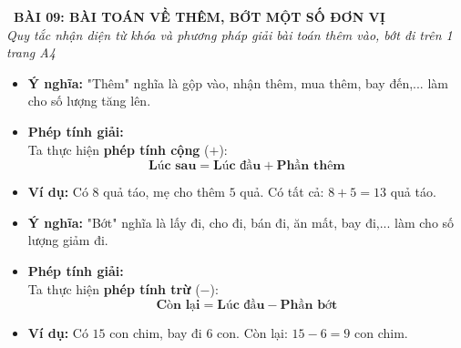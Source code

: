 \documentclass[11pt,a4paper]{article}
\begin{document}
\begin{tcolorbox}[
  enhanced,
  colback=violet!8!white,
  colframe=violet!70!black,
  arc=3mm, boxrule=1.2pt,
  left=3mm, right=3mm, top=2mm, bottom=2mm,
  halign=center
]
  {\LARGE\bfseries\color{violet!90!black}\faBookmark\ BÀI 09: BÀI TOÁN VỀ THÊM, BỚT MỘT SỐ ĐƠN VỊ}\\[1mm]
  {\itshape\footnotesize\color{black!75} Quy tắc nhận diện từ khóa và phương pháp giải bài toán thêm vào, bớt đi trên 1 trang A4}
\end{tcolorbox}

\vspace{-2mm}

\noindent
\begin{minipage}[t]{0.49\textwidth}\vspace{0pt}
\begin{tcolorbox}[
  enhanced,
  colback=violet!4!white,
  colframe=violet!75!black,
  arc=2mm, boxrule=0.8pt,
  left=2mm, right=2mm, top=1.8mm, bottom=1.8mm,
  title={\footnotesize\bfseries\color{white}\faKey\ 1. Bài toán về "thêm"}
]
{\footnotesize
\begin{itemize}\setlength{\itemsep}{1pt}\setlength{\leftskip}{-2.5mm}
  \item \textbf{Ý nghĩa:} "Thêm" nghĩa là gộp vào, nhận thêm, mua thêm, bay đến,... làm cho số lượng tăng lên.
  \item \textbf{Phép tính giải:}\\
  Ta thực hiện \textbf{phép tính cộng} ($+$):
  $$\mathbf{\text{Lúc sau} = \text{Lúc đầu} + \text{Phần thêm}}$$
  \item \textbf{Ví dụ:} Có $8$ quả táo, mẹ cho thêm $5$ quả. Có tất cả: $8 + 5 = 13$ quả táo.
\end{itemize}
}
\end{tcolorbox}
\end{minipage}
\hfill
\begin{minipage}[t]{0.49\textwidth}\vspace{0pt}
\begin{tcolorbox}[
  enhanced,
  colback=teal!4!white,
  colframe=teal!75!black,
  arc=2mm, boxrule=0.8pt,
  left=2mm, right=2mm, top=1.8mm, bottom=1.8mm,
  title={\footnotesize\bfseries\color{white}\faSliders\ 2. Bài toán về "bớt"}
]
{\footnotesize
\begin{itemize}\setlength{\itemsep}{1pt}\setlength{\leftskip}{-2.5mm}
  \item \textbf{Ý nghĩa:} "Bớt" nghĩa là lấy đi, cho đi, bán đi, ăn mất, bay đi,... làm cho số lượng giảm đi.
  \item \textbf{Phép tính giải:}\\
  Ta thực hiện \textbf{phép tính trừ} ($-$):
  $$\mathbf{\text{Còn lại} = \text{Lúc đầu} - \text{Phần bớt}}$$
  \item \textbf{Ví dụ:} Có $15$ con chim, bay đi $6$ con. Còn lại: $15 - 6 = 9$ con chim.
\end{itemize}
}
\end{tcolorbox}
\end{minipage}
\end{document}
